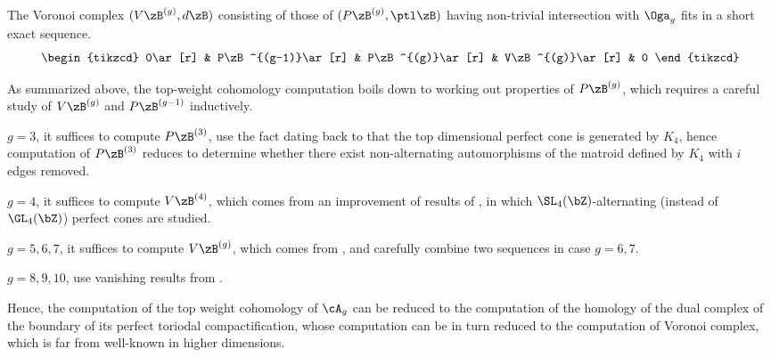 \documentclass[a4paper, twoside]{article}
\begin{document}
\begin{thm}
	The Voronoi complex $(V\zB^{(g)},d\zB)$ consisting of those of $(P\zB^{(g)},\ptl\zB)$ having non-trivial intersection with $\Oga_{g}$ fits in a short exact sequence.
	\[
		\begin{tikzcd}
			0\ar[r] & P\zB^{(g-1)}\ar[r] & P\zB^{(g)}\ar[r] & V\zB^{(g)}\ar[r] & 0
		\end{tikzcd}
	\]
\end{thm}



As summarized above, the top-weight cohomology computation boils down to working out properties of $P\zB^{(g)}$, which requires a careful study of $V\zB^{(g)}$ and $P\zB^{(g-1)}$ inductively.

\begin{itm}
	\item $g=3$, it suffices to compute $P\zB^{(3)}$, use the fact dating back to \cite{Voronoi1908} that the top dimensional perfect cone is generated by $K_{4}$, hence computation of $P\zB^{(3)}$ reduces to determine whether there exist non-alternating automorphisms of the matroid defined by $K_{4}$ with $i$ edges removed.
	\item $g=4$, it suffices to compute $V\zB^{(4)}$, which comes from an improvement of results of \cite{LS1978}, in which $\SL_{4}(\bZ)$-alternating (instead of $\GL_{4}(\bZ)$) perfect cones are studied.
	\item $g=5,6,7$, it suffices to compute $V\zB^{(g)}$, which comes from \cite[Theorem~4.3]{EVGS2013}, and carefully combine two sequences in case $g=6,7$.
	\item $g=8,9,10$, use vanishing results from \cite[Theorem~4.5]{SEVKM2019}.
\end{itm}

	Hence, the computation of the top weight cohomology of $\cA_{g}$ can be reduced to the computation of the homology of the dual complex of the boundary of its perfect toriodal compactification, whose computation can be in turn reduced to the computation of Voronoi complex, which is far from well-known in higher dimensions.





\end{document}
